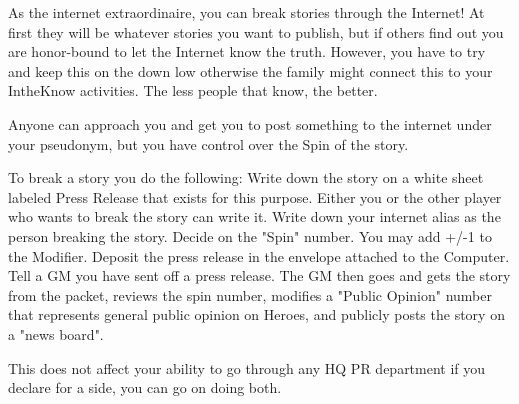 \documentclass[green]{LRSguildcamp1}
\begin{document}
\name{\gInternetPR{}}

As \cTween{} the internet extraordinaire, you can break stories through the Internet! At first they will be whatever stories you want to publish, but if others find out you are honor-bound to let the Internet know the truth. However, you have to try and keep this on the down low otherwise the family might connect this to your IntheKnow activities. The less people that know, the better. 

Anyone can approach you and get you to post something to the internet under your pseudonym, but you have control over the Spin of the story. 

To break a story you do the following:
Write down the story on a white sheet labeled Press Release that exists for this purpose. Either you or the other player who wants to break the story can write it. 
Write down your internet alias as the person breaking the story.  
Decide on the "Spin" number. You may add +/-1 to the Modifier. 
Deposit the press release in the envelope attached to the Computer. 
Tell a GM you have sent off a press release.
The GM then goes and gets the story from the packet, reviews the spin number, modifies a "Public Opinion" number that represents general public opinion on Heroes, and publicly posts the story on a "news board". 

This does not affect your ability to go through any HQ PR department if you declare for a side, you can go on doing both. 
\end{document}
